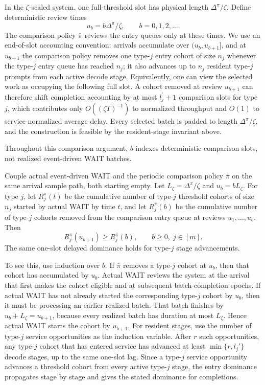 In the \(\zeta\)-scaled system, one full-threshold slot has physical length \(\Delta^\pi/\zeta\). Define deterministic review times
\[
    u_b=b\Delta^\pi/\zeta,\qquad b=0,1,2,\ldots .
\]
The comparison policy \(\bar\pi\) reviews the entry queues only at these times. We use an end-of-slot accounting convention: arrivals accumulate over \((u_b,u_{b+1}]\), and at \(u_{b+1}\) the comparison policy removes one type-\(j\) entry cohort of size \(n_j\) whenever the type-\(j\) entry queue has reached \(n_j\); it also advances up to \(n_j\) resident type-\(j\) prompts from each active decode stage. Equivalently, one can view the selected work as occupying the following full slot. A cohort removed at review \(u_{b+1}\) can therefore shift completion accounting by at most \(l_j^\prime+1\) comparison slots for type \(j\), which contributes only \(O((\zeta T)^{-1})\) to normalized throughput and \(O(1)\) to service-normalized average delay. Every selected batch is padded to length \(\Delta^\pi/\zeta\), and the construction is feasible by the resident-stage invariant above.

Throughout this comparison argument, \(b\) indexes deterministic comparison slots, not realized event-driven WAIT batches.

\begin{lemma}\label{lem:wait_one_slot_dominance}
Couple actual event-driven WAIT and the periodic comparison policy \(\bar\pi\) on the same arrival sample path, both starting empty. Let \(L_\zeta=\Delta^\pi/\zeta\) and \(u_b=bL_\zeta\). For type \(j\), let \(R_j^\pi(t)\) be the cumulative number of type-\(j\) threshold cohorts of size \(n_j\) started by actual WAIT by time \(t\), and let \(R_j^{\bar\pi}(b)\) be the cumulative number of type-\(j\) cohorts removed from the comparison entry queue at reviews \(u_1,\ldots,u_b\). Then
\[
    R_j^\pi(u_{b+1})\ge R_j^{\bar\pi}(b),
    \qquad b\ge0,\; j\in[m].
\]
The same one-slot delayed dominance holds for type-\(j\) stage advancements.
\end{lemma}
\noindent To see this, use induction over \(b\). If \(\bar\pi\) removes a type-\(j\) cohort at \(u_b\), then that cohort has accumulated by \(u_b\). Actual WAIT reviews the system at the arrival that first makes the cohort eligible and at subsequent batch-completion epochs. If actual WAIT has not already started the corresponding type-\(j\) cohort by \(u_b\), then it must be processing an earlier realized batch. That batch finishes by \(u_b+L_\zeta=u_{b+1}\), because every realized batch has duration at most \(L_\zeta\). Hence actual WAIT starts the cohort by \(u_{b+1}\). For resident stages, use the number of type-\(j\) service opportunities as the induction variable. After \(r\) such opportunities, any type-\(j\) cohort that has entered service has advanced at least \(\min\{r,l_j'\}\) decode stages, up to the same one-slot lag. Since a type-\(j\) service opportunity advances a threshold cohort from every active type-\(j\) stage, the entry dominance propagates stage by stage and gives the stated dominance for completions.

